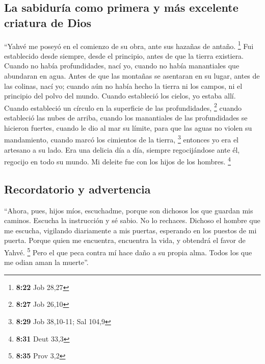 \hypertarget{la-sabiduruxeda-como-primera-y-muxe1s-excelente-criatura-de-dios}{%
\subsection{La sabiduría como primera y más excelente criatura de
Dios}\label{la-sabiduruxeda-como-primera-y-muxe1s-excelente-criatura-de-dios}}

 ``Yahvé me poseyó en el comienzo de su obra, ante sus
hazañas de antaño. \footnote{\textbf{8:22} Job 28,27} 
Fui establecido desde siempre, desde el principio, antes de que la
tierra existiera.  Cuando no había profundidades, nací
yo, cuando no había manantiales que abundaran en agua. 
Antes de que las montañas se asentaran en su lugar, antes de las
colinas, nací yo;  cuando aún no había hecho la tierra ni
los campos, ni el principio del polvo del mundo.  Cuando
estableció los cielos, yo estaba allí. Cuando estableció un círculo en
la superficie de las profundidades, \footnote{\textbf{8:27} Job 26,10}
 cuando estableció las nubes de arriba, cuando los
manantiales de las profundidades se hicieron fuertes, 
cuando le dio al mar su límite, para que las aguas no violen su
mandamiento, cuando marcó los cimientos de la tierra, \footnote{\textbf{8:29}
  Job 38,10-11; Sal 104,9}  entonces yo era el artesano a
su lado. Era una delicia día a día, siempre regocijándose ante él,
 regocijo en todo su mundo. Mi deleite fue con los hijos
de los hombres. \footnote{\textbf{8:31} Deut 33,3}

\hypertarget{recordatorio-y-advertencia}{%
\subsection{Recordatorio y
advertencia}\label{recordatorio-y-advertencia}}

 ``Ahora, pues, hijos míos, escuchadme, porque son
dichosos los que guardan mis caminos.  Escucha la
instrucción y sé sabio. No lo rechaces.  Dichoso el
hombre que me escucha, vigilando diariamente a mis puertas, esperando en
los puestos de mi puerta.  Porque quien me encuentra,
encuentra la vida, y obtendrá el favor de Yahvé. \footnote{\textbf{8:35}
  Prov 3,2}  Pero el que peca contra mí hace daño a su
propia alma. Todos los que me odian aman la muerte''.

